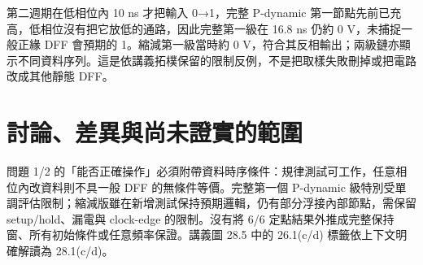 第二週期在低相位內 10 ns 才把輸入 0→1，完整 P-dynamic 第一節點先前已充高，低相位沒有把它放低的通路，因此完整第一級在 16.8 ns 仍約 0 V，未捕捉一般正緣 DFF 會預期的 1。縮減第一級當時約 0 V，符合其反相輸出；兩級鏈亦顯示不同資料序列。這是依講義拓樸保留的限制反例，不是把取樣失敗刪掉或把電路改成其他靜態 DFF。

\section{討論、差異與尚未證實的範圍}

問題 1/2 的「能否正確操作」必須附帶資料時序條件：規律測試可工作，任意相位內改資料則不具一般 DFF 的無條件等價。完整第一個 P-dynamic 級特別受單調評估限制；縮減版雖在新增測試保持預期邏輯，仍有部分浮接內部節點，需保留 setup/hold、漏電與 clock-edge 的限制。沒有將 6/6 定點結果外推成完整保持窗、所有初始條件或任意頻率保證。講義圖 28.5 中的 26.1(c/d) 標籤依上下文明確解讀為 28.1(c/d)。
